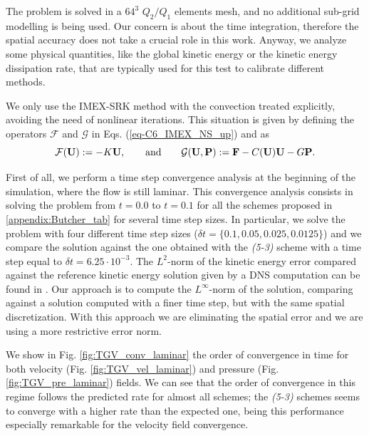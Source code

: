 The problem is solved in a $64^3$ $Q_2/Q_1$ elements mesh, and no additional sub-grid modelling is being used. Our concern is about the time integration, therefore the spatial accuracy does not take a crucial role in this work. Anyway, we analyze some physical quantities, like the global kinetic energy or the kinetic energy dissipation rate, that are typically used for this test to calibrate different methods.

We only use the IMEX-SRK method with the convection treated explicitly, avoiding the need of nonlinear iterations. This situation is given by defining the operators $\mathcal{F}$ and $\mathcal{G}$ in  Eqs. (\ref{eq-C6_IMEX_NS_up}) and  as
$$\mathcal{F}({\bf U}):=-K{\bf U},\quad\quad\mbox{and}\quad\quad\mathcal{G}({\bf U},{\bf P}):={\bf F}-C({\bf U}){\bf U}-G{\bf P}.$$

First of all, we perform a time step convergence analysis at the beginning of the simulation, where the flow is still laminar. This convergence analysis consists in solving the problem from $t=0.0$ to $t=0.1$ for all the schemes proposed in \ref{appendix:Butcher_tab} for several time step sizes. In particular, we solve the problem with four different time step sizes ($\delta t=\{0.1,0.05,0.025,0.0125\}$) and we compare the solution against the one obtained with the \textit{(5-3)} scheme with a time step equal to $\delta t=6.25\cdot10^{-3}$. The $L^2$-norm of the kinetic energy error compared against the reference kinetic energy solution given by a DNS computation can be found in  \cite{boom_time-accurate_????}. Our approach is to compute the $L^{\infty}$-norm of the solution, comparing against a solution computed with a finer time step, but with the same spatial discretization. With this approach we are eliminating the spatial error and we are using a more restrictive error norm.

We show in Fig. \ref{fig:TGV_conv_laminar} the order of convergence in time for both velocity (Fig. \ref{fig:TGV_vel_laminar}) and pressure (Fig. \ref{fig:TGV_pre_laminar}) fields. We can see that the order of convergence in this regime follows the predicted rate for almost all schemes; the \textit{(5-3)} schemes seems to converge with a higher rate than the expected one, being this performance especially remarkable for the velocity field convergence.

